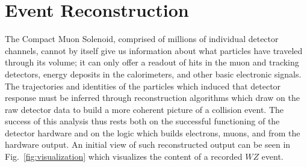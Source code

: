 \chapter{Event Reconstruction}
\label{chapter:reconstruction}

The Compact Muon Solenoid, comprised of millions of individual detector channels, cannot by itself give us information about what particles have traveled through its volume; it can only offer a readout of hits in the muon and tracking detectors, energy deposits in the calorimeters, and other basic electronic signals.  The trajectories and identities of the particles which induced that detector response must be inferred through reconstruction algorithms which draw on the raw detector data to build a more coherent picture of a collision event.  The success of this analysis thus rests both on the successful functioning of the detector hardware and on the logic which builds electrons, muons, and \MET from the hardware output.  An initial view of such reconstructed output can be seen in Fig.~\ref{fig:visualization} which visualizes the content of a recorded $WZ$ event.

